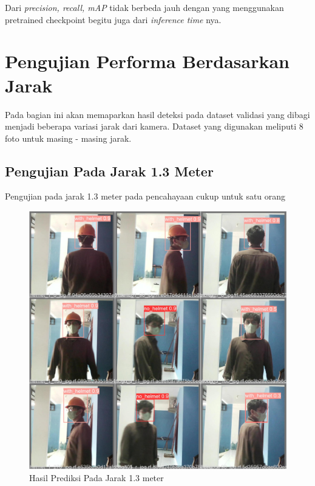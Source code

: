 Dari \emph{precision, recall, mAP} tidak berbeda jauh dengan yang menggunakan pretrained checkpoint begitu juga dari \emph{inference time} nya.

\section{Pengujian Performa Berdasarkan Jarak}
\label{sec:ujiberdasarkanjarak}

Pada bagian ini akan memaparkan hasil deteksi pada dataset validasi yang dibagi menjadi beberapa variasi jarak dari kamera. Dataset yang digunakan meliputi 8 foto untuk masing - masing jarak.

\subsection{Pengujian Pada Jarak 1.3 Meter}
\label{subsec:ujijarak1_3meter}

\par Pengujian pada jarak 1.3 meter pada pencahayaan cukup untuk satu orang

\begin{figure}[ht]
  \centering
  \includegraphics[scale=0.2]{gambar/BerdasarkanJarak/Jarak1_3/val_batch0_pred.jpg}
  \caption{Hasil Prediksi Pada Jarak 1.3 meter}
\end{figure}

